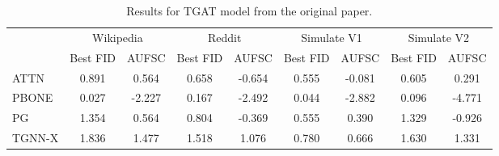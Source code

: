 \begin{table}
\centering
\begin{tabular}{lcccccccc}
\toprule
 & \multicolumn{2}{c}{Wikipedia} & \multicolumn{2}{c}{Reddit} & \multicolumn{2}{c}{Simulate V1} & \multicolumn{2}{c}{Simulate V2} \\
 & Best FID & AUFSC & Best FID & AUFSC & Best FID & AUFSC & Best FID & AUFSC \\
\midrule
ATTN & 0.891 & 0.564 & 0.658 & -0.654 & 0.555 & -0.081 & 0.605 & 0.291 \\
PBONE & 0.027 & -2.227 & 0.167 & -2.492 & 0.044 & -2.882 & 0.096 & -4.771 \\
PG & 1.354 & 0.564 & 0.804 & -0.369 & 0.555 & 0.390 & 1.329 & -0.926 \\
TGNN-X & 1.836 & 1.477 & 1.518 & 1.076 & 0.780 & 0.666 & 1.630 & 1.331 \\
\bottomrule
\end{tabular}
\caption{\label{tab:tgat_results_og}Results for TGAT model from the original paper.}
\end{table}
